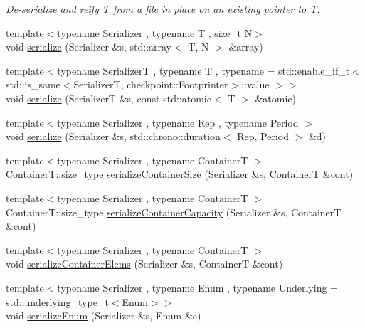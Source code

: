 \begin{DoxyCompactItemize}
\begin{DoxyCompactList}\small\item\em De-\/serialize and reify {\ttfamily T} from a file in place on an existing pointer to {\ttfamily T}. \end{DoxyCompactList}\item 
{\footnotesize template$<$typename Serializer , typename T , size\+\_\+t N$>$ }\\void \hyperlink{namespacecheckpoint_a976e83bf5f22b7bfc5036fd829be039e}{serialize} (Serializer \&s, std\+::array$<$ T, N $>$ \&array)
\item 
{\footnotesize template$<$typename SerializerT , typename T , typename  = std\+::enable\+\_\+if\+\_\+t$<$    std\+::is\+\_\+same$<$\+Serializer\+T, checkpoint\+::\+Footprinter$>$\+::value  $>$$>$ }\\void \hyperlink{namespacecheckpoint_a40ca9a5c99807bd8a0610098d94b5125}{serialize} (SerializerT \&s, const std\+::atomic$<$ T $>$ \&atomic)
\item 
{\footnotesize template$<$typename Serializer , typename Rep , typename Period $>$ }\\void \hyperlink{namespacecheckpoint_aec244476371c452d9d9318b9d5b24401}{serialize} (Serializer \&s, std\+::chrono\+::duration$<$ Rep, Period $>$ \&d)
\item 
{\footnotesize template$<$typename Serializer , typename ContainerT $>$ }\\Container\+T\+::size\+\_\+type \hyperlink{namespacecheckpoint_a3359595d5a4c6fcf5fc95069c71f869b}{serialize\+Container\+Size} (Serializer \&s, ContainerT \&cont)
\item 
{\footnotesize template$<$typename Serializer , typename ContainerT $>$ }\\Container\+T\+::size\+\_\+type \hyperlink{namespacecheckpoint_abb25020fd55429c701342e79205a8d9a}{serialize\+Container\+Capacity} (Serializer \&s, ContainerT \&cont)
\item 
{\footnotesize template$<$typename Serializer , typename ContainerT $>$ }\\void \hyperlink{namespacecheckpoint_a9c880ba9bb9a106e784e06554b2fbcf2}{serialize\+Container\+Elems} (Serializer \&s, ContainerT \&cont)
\item 
{\footnotesize template$<$typename Serializer , typename Enum , typename Underlying  = std\+::underlying\+\_\+type\+\_\+t$<$\+Enum$>$$>$ }\\void \hyperlink{namespacecheckpoint_a5f368cb543eec78bb608a68fe2401562}{serialize\+Enum} (Serializer \&s, Enum \&e)

\end{DoxyCompactItemize}
